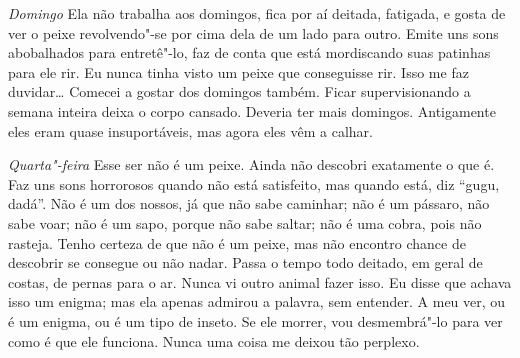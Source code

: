 \textit{Domingo}  Ela não trabalha aos domingos, fica por aí deitada, fatigada, e
gosta de ver o peixe revolvendo"-se por cima dela de um lado para outro. Emite 
uns sons abobalhados para entretê"-lo, faz de conta que está
mordiscando suas patinhas para ele rir. Eu nunca tinha visto um peixe que
conseguisse rir. Isso me faz duvidar\ldots{} Comecei a gostar dos domingos também.
Ficar supervisionando a semana inteira deixa o corpo cansado. Deveria ter mais
domingos. Antigamente eles eram quase insuportáveis, mas agora eles vêm a calhar.

\textit{Quarta"-feira}   Esse ser não é um peixe. Ainda não descobri exatamente o que é.
Faz uns sons horrorosos quando não está satisfeito, mas quando está, diz
“gugu, dadá”. Não é um dos nossos, já que não sabe caminhar; não é
um pássaro, não sabe voar; não é um sapo, porque não sabe saltar; não é
uma cobra, pois não rasteja. Tenho certeza de que não é um peixe, mas não
encontro chance de descobrir se consegue ou não nadar. Passa o tempo todo
deitado, em geral de costas, de pernas para o ar. Nunca vi
outro animal fazer isso. Eu disse que achava isso um enigma; mas ela
apenas admirou a palavra, sem entender. A meu ver, ou é um enigma, ou é um
tipo de inseto. Se ele morrer, vou desmembrá"-lo para ver como é que ele
funciona. Nunca uma coisa me deixou tão perplexo.

